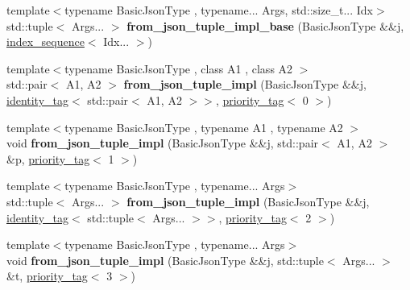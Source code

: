 \begin{DoxyCompactItemize}
\item 
\mbox{\label{namespacenlohmann_1_1detail_aaf1b6ce9b599cd5cde8053c194082ca9}} 
{\footnotesize template$<$typename Basic\+Json\+Type , typename... Args, std\+::size\+\_\+t... Idx$>$ }\\std\+::tuple$<$ Args... $>$ {\bfseries from\+\_\+json\+\_\+tuple\+\_\+impl\+\_\+base} (Basic\+Json\+Type \&\&j, \hyperlink{structnlohmann_1_1detail_1_1integer__sequence}{index\+\_\+sequence}$<$ Idx... $>$)
\item 
\mbox{\label{namespacenlohmann_1_1detail_aef618f284e214156fcfa6dfecd1dcdbe}} 
{\footnotesize template$<$typename Basic\+Json\+Type , class A1 , class A2 $>$ }\\std\+::pair$<$ A1, A2 $>$ {\bfseries from\+\_\+json\+\_\+tuple\+\_\+impl} (Basic\+Json\+Type \&\&j, \hyperlink{structnlohmann_1_1detail_1_1identity__tag}{identity\+\_\+tag}$<$ std\+::pair$<$ A1, A2 $>$$>$, \hyperlink{structnlohmann_1_1detail_1_1priority__tag}{priority\+\_\+tag}$<$ 0 $>$)
\item 
\mbox{\label{namespacenlohmann_1_1detail_af1bc20d589bcfe61a23974cb17a34d6f}} 
{\footnotesize template$<$typename Basic\+Json\+Type , typename A1 , typename A2 $>$ }\\void {\bfseries from\+\_\+json\+\_\+tuple\+\_\+impl} (Basic\+Json\+Type \&\&j, std\+::pair$<$ A1, A2 $>$ \&p, \hyperlink{structnlohmann_1_1detail_1_1priority__tag}{priority\+\_\+tag}$<$ 1 $>$)
\item 
\mbox{\label{namespacenlohmann_1_1detail_a249aceda550177adb6d09382d1377a60}} 
{\footnotesize template$<$typename Basic\+Json\+Type , typename... Args$>$ }\\std\+::tuple$<$ Args... $>$ {\bfseries from\+\_\+json\+\_\+tuple\+\_\+impl} (Basic\+Json\+Type \&\&j, \hyperlink{structnlohmann_1_1detail_1_1identity__tag}{identity\+\_\+tag}$<$ std\+::tuple$<$ Args... $>$$>$, \hyperlink{structnlohmann_1_1detail_1_1priority__tag}{priority\+\_\+tag}$<$ 2 $>$)
\item 
\mbox{\label{namespacenlohmann_1_1detail_a31838a6c7a461d3a889e6fc40b3a19e6}} 
{\footnotesize template$<$typename Basic\+Json\+Type , typename... Args$>$ }\\void {\bfseries from\+\_\+json\+\_\+tuple\+\_\+impl} (Basic\+Json\+Type \&\&j, std\+::tuple$<$ Args... $>$ \&t, \hyperlink{structnlohmann_1_1detail_1_1priority__tag}{priority\+\_\+tag}$<$ 3 $>$)

\end{DoxyCompactItemize}
